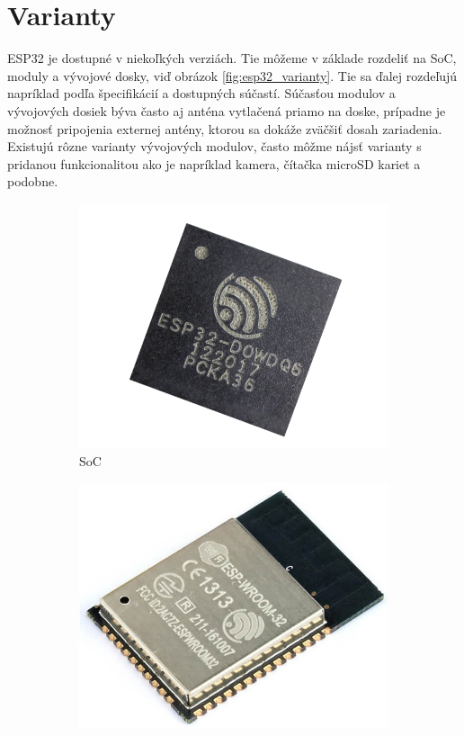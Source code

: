 \section{Varianty}

ESP32 je dostupné v niekoľkých verziách. Tie môžeme v základe rozdeliť na SoC, moduly a vývojové dosky, viď obrázok \ref{fig:esp32_varianty}. Tie sa ďalej rozdeľujú napríklad podľa špecifikácií a dostupných súčastí. Súčasťou  modulov a vývojových dosiek býva často aj anténa vytlačená priamo na doske, prípadne je možnosť pripojenia externej antény, ktorou sa dokáže zväčšiť dosah zariadenia. Existujú rôzne varianty vývojových modulov, často môžme nájsť varianty s pridanou funkcionalitou ako je napríklad kamera, čítačka microSD kariet a podobne.

\begin{figure}[ht]
    \centering
    \begin{subfigure}{.3\textwidth}
      \centering
      \includegraphics[width=.8\linewidth]{obrazky-figures/esp-soc.png}  
      \caption{SoC\footnotemark[2]}
      \label{fig:esp32_soc}
    \end{subfigure}
    \begin{subfigure}{.3\textwidth}
      \centering
      \includegraphics[width=.8\linewidth]{obrazky-figures/esp-module.jpg}  

\end{subfigure}
\end{figure}
